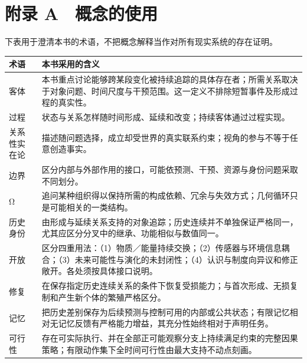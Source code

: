\documentclass[
  11pt,
  oneside]{book}
\newcounter{none} %
\begin{document}
\par\endgroup

\chapter{附录 A　概念的使用}\label{ph-app-a}

下表用于澄清本书的术语，不把概念解释当作对所有现实系统的存在证明。

{\def\LTcaptype{none} %
\begin{longtable}[]{@{}
  >{\raggedright\arraybackslash}p{}
  >{\raggedright\arraybackslash}p{}@{}}
\toprule\noalign{}
\begin{minipage}[b]{\linewidth}\raggedright
术语
\end{minipage} & \begin{minipage}[b]{\linewidth}\raggedright
本书采用的含义
\end{minipage} \\
\midrule\noalign{}
\endhead
\bottomrule\noalign{}
\endlastfoot
客体 & 本书重点讨论能够跨某段变化被持续追踪的具体存在者；所需关系取决于对象问题、时间尺度与干预范围。这一定义不排除短暂事件及形成过程的真实性。 \\
过程 & 状态与关系怎样随时间形成、延续和改变；持续客体通过过程实现。 \\
关系性实在论 & 描述随问题选择，成立却受世界的真实联系约束；视角的参与不等于任意创造事实。 \\
边界 & 区分内部与外部作用的接口，可能依预测、干预、资源与身份问题采取不同划分。 \\
Ω & 追问某种组织得以保持所需的构成依赖、冗余与失效方式；几何循环只是可能相关的一类结构。 \\
历史身份 & 由形成与延续关系支持的对象追踪；历史连续并不单独保证严格同一，尤其应区分分叉中的继承、功能相似与数值同一。 \\
开放 & 区分四重用法：（1）物质／能量持续交换；（2）传感器与环境信息耦合；（3）未来可能性与演化的未封闭性；（4）认识与制度向异议和修正敞开。各处须按具体接口说明。 \\
修复 & 在保存指定历史连续关系的条件下恢复受损能力；与首次形成、无损复制和产生新个体的繁殖严格区分。 \\
记忆 & 把历史差别保存为后续预测与控制可用的内部或公共状态；有限记忆相对无记忆反馈有严格能力增益，其充分性始终相对于声明任务。 \\
可行性 & 存在可实际执行、并在全部正可能观察分支上持续满足约束的完整因果策略；有限动作集下全时间可行性由最大支持不动点刻画。 \\

\end{longtable}}
\end{document}
